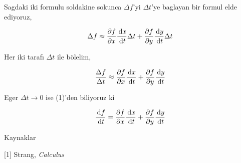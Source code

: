 \documentclass[12pt,fleqn]{article}\usepackage{../../common}
\begin{document}
Sagdaki iki formulu soldakine sokunca $\Delta f$'yi $\Delta t$'ye baglayan
bir formul elde ediyoruz,

$$
\Delta f \approx
\frac{\partial f}{\partial x} \frac{\,\mathrm{d} x}{\,\mathrm{d} t} \Delta t +
\frac{\partial f}{\partial y} \frac{\,\mathrm{d} y}{\,\mathrm{d} t} \Delta t
$$

Her iki tarafı $\Delta t$ ile bölelim,

$$
\frac{\Delta f}{\Delta t} \approx
\frac{\partial f}{\partial x} \frac{\,\mathrm{d} x}{\,\mathrm{d} t} +
\frac{\partial f}{\partial y} \frac{\,\mathrm{d} y}{\,\mathrm{d} t}
$$

Eger $\Delta t \to 0$ ise (1)'den biliyoruz ki 

$$
\frac{\,\mathrm{d} f}{\,\mathrm{d} t} =
\frac{\partial f}{\partial x} \frac{\,\mathrm{d} x}{\,\mathrm{d} t} +
\frac{\partial f}{\partial y} \frac{\,\mathrm{d} y}{\,\mathrm{d} t}
$$

Kaynaklar

[1] Strang, {\em Calculus}
\end{document}
